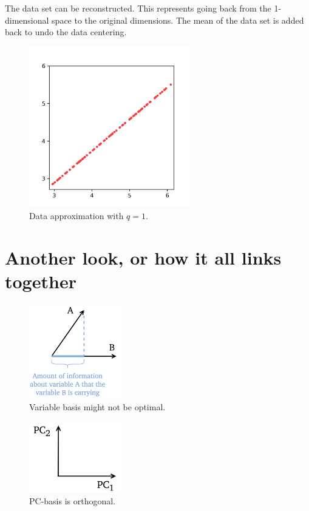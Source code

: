 \documentclass[10pt,twocolumn]{article}
\begin{document}
The data set can be reconstructed. This represents going back from the 1-dimensional space to the original dimensions. The mean of the data set is added back to undo the data centering.

\begin{figure}[H]
\centering\includegraphics[width=7cm]{python-data-approximation.png}
\caption{Data approximation with $q = 1$.}
\label{fig:python-data-approximation}
\end{figure}

\section{Another look, or how it all links together}

\begin{figure}[H]
\centering\includegraphics[width=4cm]{variable-basis.png}
\caption{Variable basis might not be optimal.}
\label{fig:variable-basis}
\end{figure}

\begin{figure}[H]
\centering\includegraphics[width=4cm]{PC-basis.png}
\caption{PC-basis is orthogonal.}
\label{fig:PC-basis}
\end{figure}
\end{document}

